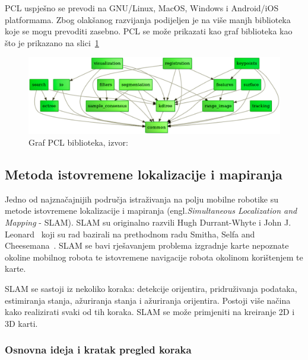 PCL uspješno se prevodi na GNU/Linux, MacOS, Windows i Android/iOS
platformama. Zbog olakšanog razvijanja podijeljen je na više manjh
biblioteka koje se mogu prevoditi zasebno. PCL se može prikazati kao
graf biblioteka kao što je prikazano na slici~\ref{fig:pcl-graph.png}

\setcounter{figure}{0}
\begin{figure}[h]
\renewcommand{\figurename}{Grafikon}
\centering
\includegraphics[scale=0.40]{figures/pcl-graph.png}
\caption{Graf PCL biblioteka, izvor:~\cite{web:pcl}}
\label{fig:pcl-graph.png}
\end{figure}



\newpage
\subsection{Metoda istovremene lokalizacije i mapiranja} %
\label{sub:Slam}
Jedno od najznačajnijih područja istraživanja na polju mobilne robotike
su metode istovremene lokalizacije i mapiranja
(engl.\textit{Simultaneous Localization and Mapping} - SLAM). SLAM su
originalno razvili Hugh Durrant-Whyte i John J.
Leonard~\cite{Durrant:91b} koji su rad bazirali na prethodnom radu
Smitha, Selfa and Cheesemana~\cite{Smith86}. SLAM se bavi rješavanjem
problema izgradnje karte nepoznate okoline mobilnog robota te istovremene
navigacije robota okolinom korištenjem te karte.

SLAM se sastoji iz nekoliko koraka: detekcije orijentira, pridruživanja
podataka, estimiranja stanja, ažuriranja stanja i ažuriranja orijentira.
Postoji više načina kako realizirati svaki od tih koraka. SLAM se može
primjeniti na kreiranje 2D i 3D karti.

\subsubsection{Osnovna ideja i kratak pregled koraka} %
\label{ssub:Osnovna ideja } 

